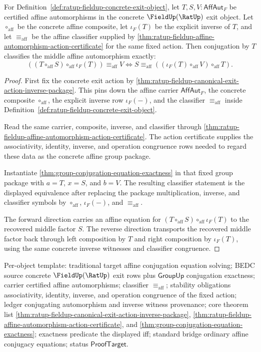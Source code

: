 \begin{theorem}
\label{thm:ratup-fieldup-affine-conjugation-equation-exactness-exit}
For Definition~\ref{def:ratup-fieldup-concrete-exit-object}, let
$T,S,V:\mathsf{AffAut}_F$ be certified affine automorphisms in the concrete
$\FieldUp(\RatUp)$ exit object. Let $\circ_{\mathrm{aff}}$ be the concrete
affine composite, let $\iota_F(T)$ be the explicit inverse of $T$, and let
$\equiv_{\mathrm{aff}}$ be the affine classifier supplied by
\autoref{thm:ratup-fieldup-affine-automorphism-action-certificate} for the
same fixed action. Then conjugation by $T$ classifies the middle affine
automorphism exactly:
$$
((T\circ_{\mathrm{aff}}S)\circ_{\mathrm{aff}}\iota_F(T))\equiv_{\mathrm{aff}}V
\Longleftrightarrow
S\equiv_{\mathrm{aff}}((\iota_F(T)\circ_{\mathrm{aff}}V)\circ_{\mathrm{aff}}T).
$$
\end{theorem}
\begin{proof}
First fix the concrete exit action by
\autoref{thm:ratup-fieldup-canonical-exit-action-inverse-package}. This pins
down the affine carrier $\mathsf{AffAut}_F$, the concrete composite
$\circ_{\mathrm{aff}}$, the explicit inverse row $\iota_F(-)$, and the
classifier $\equiv_{\mathrm{aff}}$ inside
Definition~\ref{def:ratup-fieldup-concrete-exit-object}.

Read the same carrier, composite, inverse, and classifier through
\autoref{thm:ratup-fieldup-affine-automorphism-action-certificate}. The action
certificate supplies the associativity, identity, inverse, and operation
congruence rows needed to regard these data as the concrete affine group
package.

Instantiate \autoref{thm:group-conjugation-equation-exactness} in that fixed
group package with $a=T$, $x=S$, and $b=V$. The resulting classifier statement
is the displayed equivalence after replacing the package multiplication,
inverse, and classifier symbols by $\circ_{\mathrm{aff}}$, $\iota_F(-)$, and
$\equiv_{\mathrm{aff}}$.

The forward direction carries an affine equation for
$(T\circ_{\mathrm{aff}}S)\circ_{\mathrm{aff}}\iota_F(T)$ to the recovered middle
factor $S$. The reverse direction transports the recovered middle factor back
through left composition by $T$ and right composition by $\iota_F(T)$, using the
same concrete inverse witnesses and classifier congruence.
\end{proof}

Per-object template: traditional target affine conjugation equation solving;
BEDC source concrete $\FieldUp(\RatUp)$ exit rows plus $\mathsf{GroupUp}$
conjugation exactness; carrier certified affine automorphisms; classifier
$\equiv_{\mathrm{aff}}$; stability obligations associativity, identity, inverse,
and operation congruence of the fixed action; ledger conjugating automorphism
and inverse witness provenance; core theorem list
\autoref{thm:ratup-fieldup-canonical-exit-action-inverse-package},
\autoref{thm:ratup-fieldup-affine-automorphism-action-certificate}, and
\autoref{thm:group-conjugation-equation-exactness}; exactness predicate the
displayed iff; standard bridge ordinary affine conjugacy equations; status
$\mathsf{ProofTarget}$.

